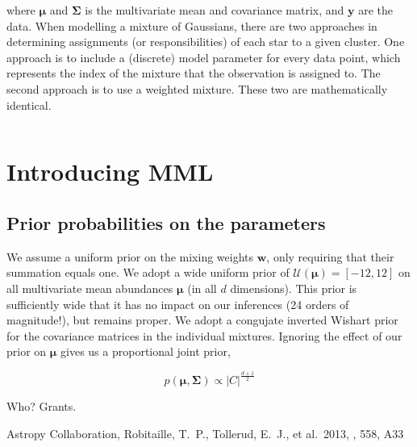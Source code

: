 \documentclass{aastex61}
\begin{document}
\noindent{}where $\bm{\mu}$ and $\bm{\Sigma}$ is the multivariate mean and 
covariance matrix, and $\bm{y}$ are the data.  When modelling a mixture of
Gaussians, there are two approaches in determining assignments (or
responsibilities) of each star to a given cluster. One approach is to include
a (discrete) model parameter for every data point, which represents the index
of the mixture that the observation is assigned to. The second approach is to 
use a weighted mixture. These two are mathematically identical.


\begin{equation}
\end{equation}


\section{Introducing MML}


\subsection{Prior probabilities on the parameters}


We assume a uniform prior on the mixing weights $\bm{w}$, only requiring that
their summation equals one. We adopt a wide uniform prior of $\mathcal{U}(\bm{\mu}) = [-12, 12]$ on all
multivariate mean abundances $\bm{\mu}$ (in all $d$ dimensions). This prior
is sufficiently wide that it has no impact on our inferences (24 orders of
magnitude!), but remains proper. We adopt a congujate inverted Wishart prior 
for the covariance matrices in the individual mixtures. Ignoring the effect of 
our prior on $\bm{\mu}$ gives us a proportional joint prior,

\begin{equation}
    p(\bm{\mu},\bm{\Sigma}) \propto |C|^{\frac{d + 1}{2}} 
\end{equation}



\acknowledgments
Who?
Grants.


\begin{thebibliography}{}

 Astropy Collaboration, Robitaille, T.~P., Tollerud, E.~J., et al.\ 2013, \aap, 558, A33 

\end{thebibliography}
\end{document}

